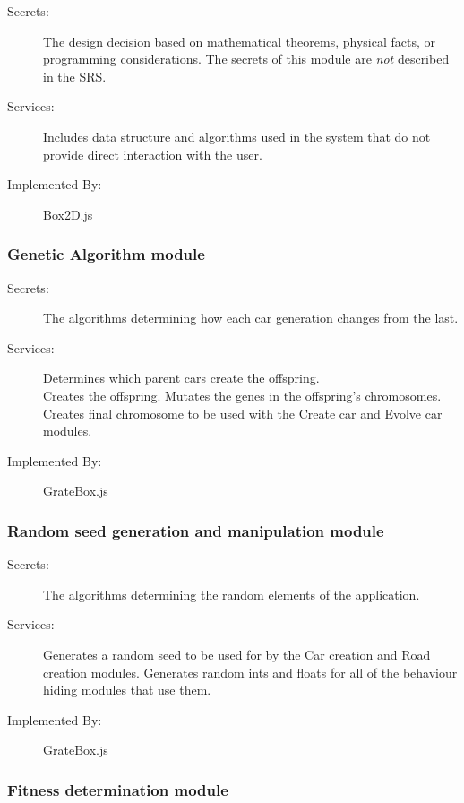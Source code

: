 \documentclass[12pt, titlepage]{article}
\begin{document}
\begin{description}
\item[Secrets:] The design decision based on mathematical theorems, physical
  facts, or programming considerations. The secrets of this module are
  \emph{not} described in the SRS.
\item[Services:] Includes data structure and algorithms used in the system that
  do not provide direct interaction with the user. 
\item[Implemented By:] \color{RoyalPurple}Box2D.js
\end{description}

\subsubsection{Genetic Algorithm module}

\begin{description}
\item[Secrets:] The algorithms determining how each car generation changes from 
the last.
\item[Services:] Determines which parent cars create the offspring. \\ Creates 
the 
offspring. Mutates the genes in the offspring's chromosomes. Creates final 
chromosome to be used with the Create car and Evolve car modules.
\item[Implemented By:] \color{RoyalPurple}GrateBox.js
\end{description}

\subsubsection{Random seed generation and manipulation module}

\begin{description}
\item[Secrets:] The algorithms determining the random elements of the 
application.
\item[Services:] Generates a random seed to be used for by the Car creation and 
Road creation modules. Generates random ints and floats for all of the behaviour 
hiding modules that use them.
\item[Implemented By:] \color{RoyalPurple} GrateBox.js
\end{description}

\subsubsection{Fitness determination module}
\end{document}
